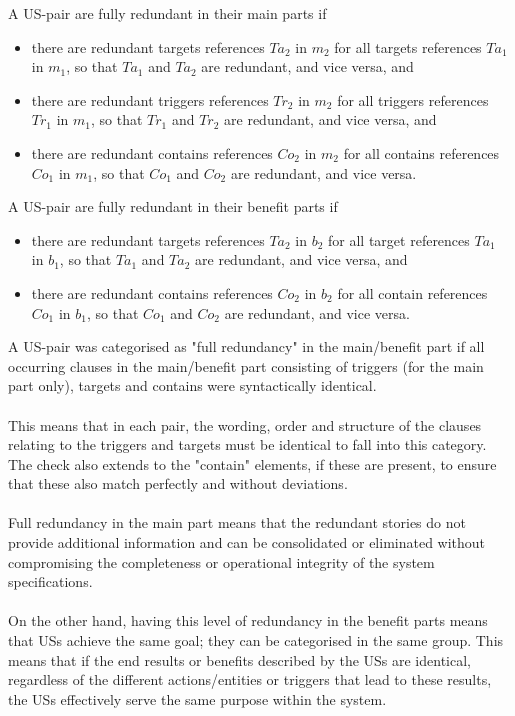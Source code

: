 \begin{definition}
	A US-pair are fully redundant in their main parts if
	\begin{itemize}
		\item there are redundant targets references $Ta_2$ in $m_2$ for all targets references $Ta_1$ in $m_1$, so that $Ta_1$ and $Ta_2$ are redundant, and vice versa, and
		
		\item there are redundant triggers references $Tr_2$ in $m_2$ for all triggers references $Tr_1$ in $m_1$, so that $Tr_1$ and $Tr_2$ are redundant, and vice versa, and
		
		\item there are redundant contains references $Co_2$ in $m_2$ for all contains references $Co_1$ in $m_1$, so that $Co_1$ and $Co_2$ are redundant, and vice versa.
		
	\end{itemize}
	A US-pair are fully redundant in their benefit parts if
	\begin{itemize}
		\item there are redundant targets references $Ta_2$ in $b_2$ for all target references $Ta_1$ in $b_1$, so that $Ta_1$ and $Ta_2$ are redundant, and vice versa, and
		
		\item there are redundant contains references $Co_2$ in $b_2$ for all contain references $Co_1$ in $b_1$, so that $Co_1$ and $Co_2$ are redundant, and vice versa.
		
	\end{itemize}
	A US-pair was categorised as "full redundancy" in the main/benefit part if all occurring clauses in the main/benefit part consisting of triggers (for the main part only), targets and contains were syntactically identical.\\\\
	This means that in each pair, the wording, order and structure of the clauses relating to the triggers and targets must be identical to fall into this category. The check also extends to the "contain" elements, if these are present, to ensure that these also match perfectly and without deviations.\\\\
	Full redundancy in the main part means that the redundant stories do not provide additional information and can be consolidated or eliminated without compromising the completeness or operational integrity of the system specifications.\\\\
	On the other hand, having this level of redundancy in the benefit parts means that USs achieve the same goal; they can be categorised in the same group. This means that if the end results or benefits described by the USs are identical, regardless of the different actions/entities or triggers that lead to these results, the USs effectively serve the same purpose within the system.
\end{definition}
